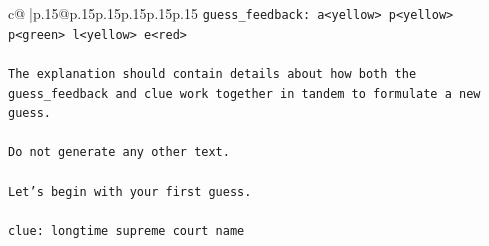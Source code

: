 \documentclass{article}
\begin{document}
{\begin{supertabular}{c@{$\;$}|p{.15\linewidth}@{}p{.15\linewidth}p{.15\linewidth}p{.15\linewidth}p{.15\linewidth}p{.15\linewidth}}
{{{\texttt{guess\_feedback: a<yellow> p<yellow> p<green> l<yellow> e<red>} \\
\\ 
\texttt{The explanation should contain details about how both the guess\_feedback and clue work together in tandem to formulate a new guess.} \\
\\ 
\texttt{Do not generate any other text.} \\
\\ 
\texttt{Let's begin with your first guess.} \\
\\ 
\texttt{clue: longtime supreme court name} \\
            }
        }
    }
     \\ \\


\end{supertabular}}
\end{document}
